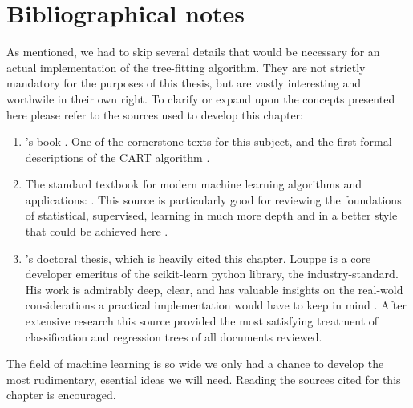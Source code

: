 \section{Bibliographical notes}
As mentioned, we had to skip several details that would be necessary for an
actual implementation of the tree-fitting algorithm. They are not strictly
mandatory for the purposes of this thesis, but are vastly interesting and
worthwile in their own right. To clarify or expand upon the concepts presented
here please refer to the sources used to develop this chapter:
\begin{enumerate}
    \item \citeauthor{breiman2017}'s book . One of the
        cornerstone texts for this subject, and the first formal descriptions of
        the CART algorithm \cite{breiman2017}.
    \item The standard textbook for modern machine learning algorithms and
        applications: . This source is particularly good
        for reviewing the foundations of statistical, supervised, learning in
        much more depth and in a better style that could be achieved here
        \cite{elements2009}.
    \item \citeauthor{louppe2014}'s doctoral thesis, which is heavily cited this
        chapter. Louppe is a core developer emeritus of the scikit-learn python
        library, the industry-standard. His work is admirably deep, clear, and
        has valuable insights on the real-wold considerations a practical
        implementation would have to keep in mind \cite{louppe2014}. After
        extensive research this source provided the most satisfying treatment of
        classification and regression trees of all documents reviewed.
\end{enumerate}

The field of machine learning is so wide we only had a chance to develop the
most rudimentary, esential ideas we will need. Reading the sources cited for
this chapter is encouraged.